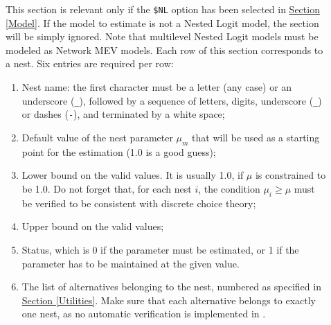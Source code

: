 \documentclass[12pt]{memoir}
\begin{document}
\begin{description}
      \item[] This section is relevant only if the
      \verb+$NL+ option has been selected in \hyperlink{Model}{Section [Model]}. 
     If the model to estimate is not a  Nested Logit model, the section will be
      simply ignored. Note that multilevel Nested Logit models must be modeled as Network MEV models.
      Each row of this section corresponds to a nest. Six entries are required per row:
      \begin{enumerate}
         \item Nest name:   the first character must be a letter (any case) or an underscore
            (\verb+_+), followed by a sequence of letters, digits, underscore (\verb+_+)
            or dashes (\verb+-+), and terminated by a white space;
         \item Default value of the nest parameter $\mu_m$ that will be used as a
            starting point for the estimation (1.0 is a good guess);
         \item Lower bound on the valid values. It is usually 1.0, if $\mu$ is
            constrained to be 1.0. Do not forget that, for each nest $i$, the condition
            $\mu_i \geq \mu$ must be verified to be consistent with discrete choice
            theory;
         \item Upper bound on the valid values;
         \item Status, which is 0 if the parameter must be estimated, or 1 if the parameter has to be maintained at the given value. 
         \item The list of alternatives belonging to the nest, numbered as specified in
            \hyperlink{Utilities}{Section [Utilities]}. Make sure that each alternative
            belongs to exactly one nest, as no automatic verification is implemented in \BIOGEME.
      \end{enumerate}


\end{description}
\end{document}
